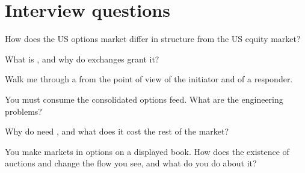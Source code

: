 \section{Interview questions}

\begin{interviewq}\label{iq:m1:options-market-structure:1}
How does the US options market differ in structure from the US equity
market?
\end{interviewq}

\begin{interviewq}\label{iq:m1:options-market-structure:2}
What is , and why do exchanges grant it?
\end{interviewq}

\begin{interviewq}\label{iq:m1:options-market-structure:3}
Walk me through a  from the point of view of the
initiator and of a responder.
\end{interviewq}

\begin{interviewq}\label{iq:m1:options-market-structure:4}
You must consume the consolidated options feed. What are the engineering
problems?
\end{interviewq}

\begin{interviewq}\label{iq:m1:options-market-structure:5}
Why do  need , and what does it cost
the rest of the market?
\end{interviewq}

\begin{interviewq}\label{iq:m1:options-market-structure:6}
You make markets in options on a displayed book. How does the existence of
auctions and  change the flow you see, and what do you do about
it?
\end{interviewq}
